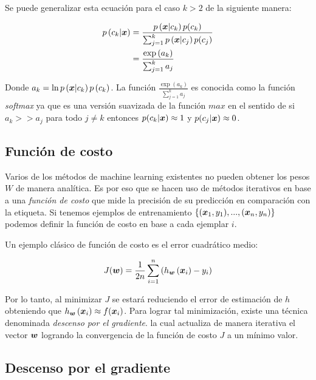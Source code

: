 Se puede generalizar esta ecuación para el caso $k > 2$ de la siguiente manera:

\begin{align}
    p\left( c_k | \boldsymbol{x} \right) &= \frac{p\left( \boldsymbol{x} | c_k \right)p(c_k)}{
                                                \sum_{j=1}^{k} p\left( \boldsymbol{x} |
                                                c_j \right) p(c_j) } \\
                                       &= \frac{\exp\left( a_k \right)}{\sum_{j=1}^{k} a_j} \\
\end{align}

Donde $a_k = \ln p\left( \boldsymbol{x} | c_k \right) p\left( c_k \right)$. La función
$\frac{\exp\left( a_k \right)}{\sum_{j=1}^{k} a_j}$ es conocida como la función
\emph{softmax} ya que es una versión suavizada de la función $max$ en el sentido
de si $a_k >> a_j$ para todo $j \neq k$ entonces $p(c_k | \boldsymbol{x}) \approx 1$ y
$p(c_j | \boldsymbol{x}) \approx 0$.

\subsection{Función de costo}

Varios de los métodos de machine learning existentes no pueden obtener los pesos
$W$ de manera analítica. Es por eso que se hacen uso de métodos iterativos en
base a una \emph{función de costo} que mide la precisión de su predicción en
comparación con la etiqueta. Si tenemos ejemplos de entrenamiento
$\{(\boldsymbol{x}_{1}, y_{1}), ..., (\boldsymbol{x}_{n}, y_{n})\}$ podemos definir la
función de costo en base a cada ejemplar $i$.

Un ejemplo clásico de función de costo es el error cuadrático medio:

\begin{align}
    J(\boldsymbol{w}) = \frac{1}{2n} \sum_{i=1}^{n}\left( h_{\boldsymbol{w}}\left( \boldsymbol{x}_{i}\right) - y_i \right)
\end{align}

Por lo tanto, al minimizar $J$ se estará reduciendo el error de estimación de
$h$ obteniendo que $h_{\boldsymbol{w}}\left( \boldsymbol{x}_{i} \right) \approx
f(\boldsymbol{x}_{i})$. Para lograr tal minimización, existe una técnica denominada
\emph{descenso por el gradiente}. la cual actualiza de manera iterativa el
vector $\boldsymbol{w}$ logrando la convergencia de la función de costo $J$ a un
mínimo valor.

\subsection{Descenso por el gradiente}

